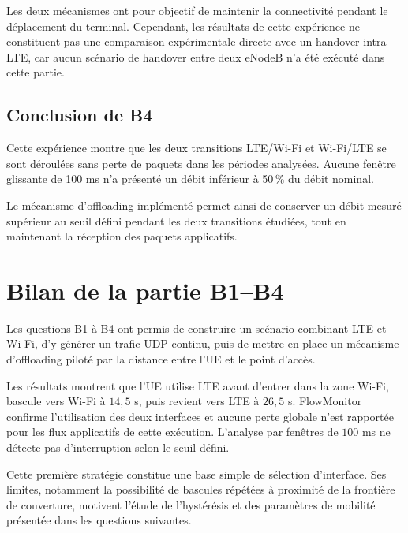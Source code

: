 Les deux mécanismes ont pour objectif de maintenir la
connectivité pendant le déplacement du terminal. Cependant,
les résultats de cette expérience ne constituent pas une
comparaison expérimentale directe avec un handover intra-LTE,
car aucun scénario de handover entre deux eNodeB n'a été
exécuté dans cette partie.

\subsection{Conclusion de B4}

Cette expérience montre que les deux transitions LTE/Wi-Fi
et Wi-Fi/LTE se sont déroulées sans perte de paquets dans
les périodes analysées. Aucune fenêtre glissante de 100 ms
n'a présenté un débit inférieur à 50\,\% du débit nominal.

Le mécanisme d'offloading implémenté permet ainsi de conserver
un débit mesuré supérieur au seuil défini pendant les deux
transitions étudiées, tout en maintenant la réception des
paquets applicatifs.

\section{Bilan de la partie B1--B4}

Les questions B1 à B4 ont permis de construire un scénario
combinant LTE et Wi-Fi, d'y générer un trafic UDP continu,
puis de mettre en place un mécanisme d'offloading piloté
par la distance entre l'UE et le point d'accès.

Les résultats montrent que l'UE utilise LTE avant d'entrer
dans la zone Wi-Fi, bascule vers Wi-Fi à $14,5$ s, puis
revient vers LTE à $26,5$ s. FlowMonitor confirme
l'utilisation des deux interfaces et aucune perte globale
n'est rapportée pour les flux applicatifs de cette
exécution. L'analyse par fenêtres de $100$ ms ne détecte
pas d'interruption selon le seuil défini.

Cette première stratégie constitue une base simple de
sélection d'interface. Ses limites, notamment la possibilité
de bascules répétées à proximité de la frontière de
couverture, motivent l'étude de l'hystérésis et des
paramètres de mobilité présentée dans les questions
suivantes.

